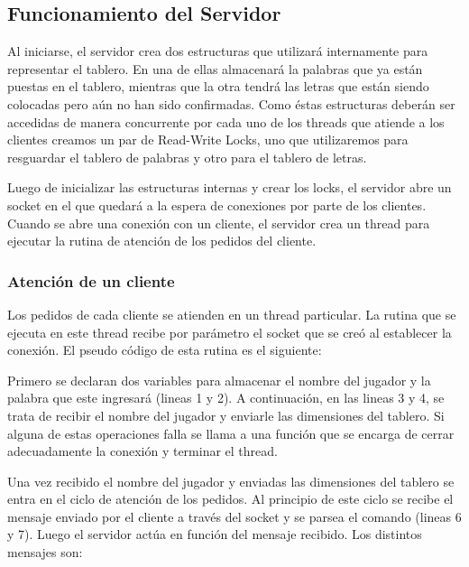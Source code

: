 \documentclass[a4paper,11pt]{article}
\begin{document}
\subsection{Funcionamiento del Servidor}
	Al iniciarse, el servidor crea dos estructuras que utilizará internamente para representar el tablero. En una de ellas almacenará la palabras que ya están puestas en el tablero, mientras que la otra tendrá las letras que están siendo colocadas pero aún no han sido confirmadas. Como éstas estructuras deberán ser accedidas de manera concurrente por cada uno de los threads que atiende a los clientes creamos un par de Read-Write Locks, uno que utilizaremos para resguardar el tablero de palabras y otro para el tablero de letras.
	
	Luego de inicializar las estructuras internas y crear los locks, el servidor abre un socket en el que quedará a la espera de conexiones por parte de los clientes. Cuando se abre una conexión con un cliente, el servidor crea un thread para ejecutar la rutina de atención de los pedidos del cliente.

\subsubsection{Atención de un cliente}
	Los pedidos de cada cliente se atienden en un thread particular. La rutina que se ejecuta en este thread recibe por parámetro el socket que se creó al establecer la conexión.
	El pseudo código de esta rutina es el siguiente:
	\newpage
	
	\restoregeometry

	Primero se declaran dos variables para almacenar el nombre del jugador y la palabra que este ingresará (lineas 1 y 2). A continuación, en las lineas 3 y 4, se trata de recibir el nombre del jugador y enviarle las dimensiones del tablero. Si alguna de estas operaciones falla se llama a una función que se encarga de cerrar adecuadamente la conexión y terminar el thread.
	
	Una vez recibido el nombre del jugador y enviadas las dimensiones del tablero se entra en el ciclo de atención de los pedidos. Al principio de este ciclo se recibe el mensaje enviado por el cliente a través del socket y se parsea el comando (lineas 6 y 7). Luego el servidor actúa en función del mensaje recibido. Los distintos mensajes son:
	
\end{document}
